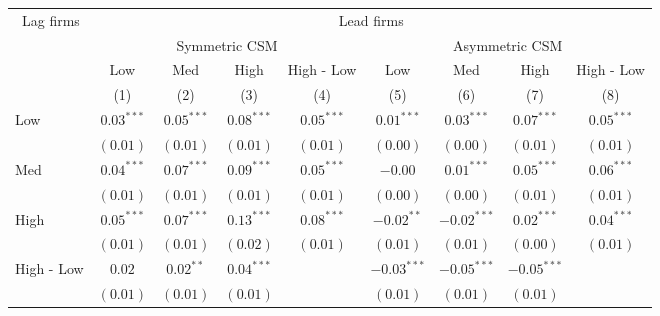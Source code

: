 \begin{tabular}{lcccccccc}
   \toprule \ Lag firms & \multicolumn{8}{c}{Lead firms} \\
 \cmidrule(l){2-9} & \multicolumn{4}{c}{Symmetric CSM} & \multicolumn{4}{c}{Asymmetric CSM} \\
 \cmidrule(l){2-5} \cmidrule(l){2-9}  & Low & Med & High & High - Low & Low & Med & High & High - Low \\ 
   \cmidrule(l){2-4} \cmidrule(l){5-5} \cmidrule(l){6-8} \cmidrule(l){9-9} \vspace{5pt} & (1) & (2) & (3) & (4) & (5) & (6) & (7) & (8) \\ 
  Low & $0.03^{***}$ & $0.05^{***}$ & $0.08^{***}$ & $0.05^{***}$ & $0.01^{***}$ & $0.03^{***}$ & $0.07^{***}$ & $0.05^{***}$ \\ 
   & $(0.01)$ & $(0.01)$ & $(0.01)$ & $(0.01)$ & $(0.00)$ & $(0.00)$ & $(0.01)$ & $(0.01)$ \\ 
  Med & $0.04^{***}$ & $0.07^{***}$ & $0.09^{***}$ & $0.05^{***}$ & $-0.00$ & $0.01^{***}$ & $0.05^{***}$ & $0.06^{***}$ \\ 
   & $(0.01)$ & $(0.01)$ & $(0.01)$ & $(0.01)$ & $(0.00)$ & $(0.00)$ & $(0.01)$ & $(0.01)$ \\ 
  High & $0.05^{***}$ & $0.07^{***}$ & $0.13^{***}$ & $0.08^{***}$ & $-0.02^{**}$ & $-0.02^{***}$ & $0.02^{***}$ & $0.04^{***}$ \\ 
   \vspace{10pt} & $(0.01)$ & $(0.01)$ & $(0.02)$ & $(0.01)$ & $(0.01)$ & $(0.01)$ & $(0.00)$ & $(0.01)$ \\ 
  High - Low & $0.02$ & $0.02^{**}$ & $0.04^{***}$ &  & $-0.03^{***}$ & $-0.05^{***}$ & $-0.05^{***}$ &  \\ 
   & $(0.01)$ & $(0.01)$ & $(0.01)$ &  & $(0.01)$ & $(0.01)$ & $(0.01)$ &  \\ 
   \bottomrule 
\end{tabular}
